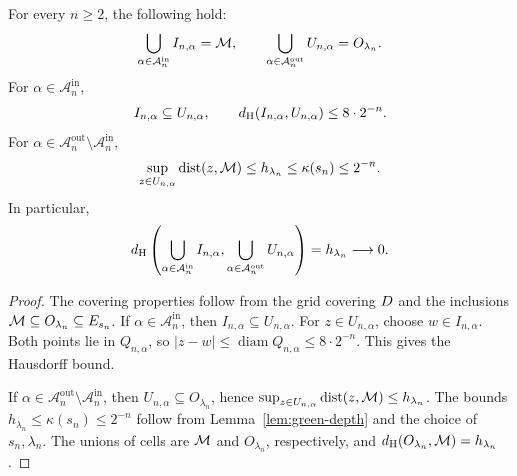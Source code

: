 \begin{proposition}
\label{prop:cellwise-inner-outer}
For every \(n\ge2\), the following hold:
\[
 \bigcup_{\alpha\in\mathcal A_n^{\mathrm{in}}}I_{n,\alpha}=\mathcal M,\qquad
 \bigcup_{\alpha\in\mathcal A_n^{\mathrm{out}}}U_{n,\alpha}=O_{\lambda_n}.
\]
For \(\alpha\in\mathcal A_n^{\mathrm{in}}\),
\[
 I_{n,\alpha}\subseteq U_{n,\alpha},
 \qquad
 d_{\mathrm H}(I_{n,\alpha},U_{n,\alpha})\le8\cdot2^{-n}.
\]
For \(\alpha\in\mathcal A_n^{\mathrm{out}}\setminus
\mathcal A_n^{\mathrm{in}}\),
\[
 \sup_{z\in U_{n,\alpha}}\operatorname{dist}(z,\mathcal M)
 \le h_{\lambda_n}\le\kappa(s_n)\le2^{-n}.
\]
In particular,
\[
 d_{\mathrm H}\left(
   \bigcup_{\alpha\in\mathcal A_n^{\mathrm{in}}}I_{n,\alpha},
   \bigcup_{\alpha\in\mathcal A_n^{\mathrm{out}}}U_{n,\alpha}
 \right)=h_{\lambda_n}\longrightarrow0.
\]
\end{proposition}
\begin{proof}
The covering properties follow from the grid covering \(D\) and the
inclusions \(\mathcal M\subseteq O_{\lambda_n}\subseteq E_{s_n}\). If
\(\alpha\in\mathcal A_n^{\mathrm{in}}\), then
\(I_{n,\alpha}\subseteq U_{n,\alpha}\).
For \(z\in U_{n,\alpha}\), choose \(w\in I_{n,\alpha}\). Both points
lie in \(Q_{n,\alpha}\), so
\(|z-w|\le\operatorname{diam}Q_{n,\alpha}\le8\cdot2^{-n}\). This gives
the Hausdorff bound.

If \(\alpha\in\mathcal A_n^{\mathrm{out}}\setminus
\mathcal A_n^{\mathrm{in}}\), then
\(U_{n,\alpha}\subseteq O_{\lambda_n}\), hence
\(\sup_{z\in U_{n,\alpha}}\operatorname{dist}(z,\mathcal M)\le h_{\lambda_n}\).
The bounds \(h_{\lambda_n}\le\kappa(s_n)\le2^{-n}\) follow from
Lemma~\ref{lem:green-depth} and the choice of \(s_n,\lambda_n\). The
unions of cells are \(\mathcal M\) and \(O_{\lambda_n}\), respectively, and
\(d_{\mathrm H}(O_{\lambda_n},\mathcal M)=h_{\lambda_n}\).
\end{proof}

